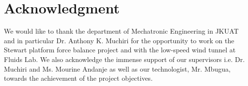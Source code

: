 \section*{Acknowledgment}
We would like to thank the department of Mechatronic Engineering in JKUAT and in particular
Dr. Anthony K. Muchiri for the opportunity to work on the Stewart platform force balance project and with
the low-speed wind tunnel at Fluids Lab. We also acknowledge the immense support of our supervisors i.e. Dr.
Muchiri and Ms. Mourine Andanje as well as our technologist, Mr. Mbugua, towards the achievement of the project objectives.
